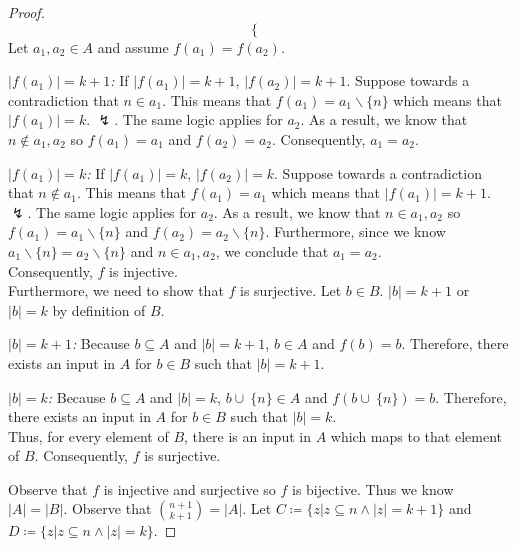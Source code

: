 \documentclass{article}
\newcommand{\union}{\cup\:}
\newcommand{\defeq}{\coloneqq}
\newenvironment{case}[1][Case]
    {\par\textit{#1:}\hfill\break}
    {}
\begin{document}
\begin{enumerate}
\begin{enumerate}
\begin{proof}
\[\begin{cases}
            \end{cases}
            \]
            Let $a_1,a_2 \in A$ and assume $f(a_1)=f(a_2)$.
            \begin{case}[$|f(a_1)|=k+1$]
                If $|f(a_1)|=k+1$, $|f(a_2)|=k+1$. Suppose towards a contradiction that $n \in a_1$. This means that $f(a_1)=a_1 \backslash \{n\}$ which means that $|f(a_1)|=k$. $\lightning$. The same logic applies for $a_2$. As a result, we know that $n \notin a_1,a_2$ so $f(a_1)=a_1$ and $f(a_2)=a_2$. Consequently, $a_1=a_2$.
            \end{case}
            \begin{case}[$|f(a_1)|=k$]
                If $|f(a_1)|=k$, $|f(a_2)|=k$. Suppose towards a contradiction that $n \notin a_1$. This means that $f(a_1)=a_1$ which means that $|f(a_1)|=k+1$. $\lightning$. The same logic applies for $a_2$. As a result, we know that $n \in a_1,a_2$ so $f(a_1)=a_1 \backslash \{n\}$ and $f(a_2)=a_2 \backslash \{n\}$. Furthermore, since we know $a_1 \backslash \{n\}=a_2 \backslash \{n\}$ and $n \in a_1,a_2$, we conclude that $a_1=a_2$.\\
            \end{case}
            Consequently, $f$ is injective.\\
            Furthermore, we need to show that $f$ is surjective. Let $b \in B$. $|b|=k+1$ or $|b|=k$ by definition of $B$.
            \begin{case}[$|b|=k+1$]
                Because $b \subseteq A$ and $|b|=k+1$, $b \in A$ and $f(b)=b$. Therefore, there exists an input in $A$ for $b \in B$ such that $|b|=k+1$.
            \end{case}
            \begin{case}[$|b|=k$]
                Because $b \subseteq A$ and $|b|=k$, $b \union \{n\} \in A$ and $f(b \union \{n\})=b$. Therefore, there exists an input in $A$ for $b \in B$ such that $|b|=k$.\\
            \end{case}
            Thus, for every element of $B$, there is an input in $A$ which maps to that element of $B$. Consequently, $f$ is surjective.
    
            Observe that $f$ is injective and surjective so $f$ is bijective. Thus we know $|A|=|B|$. 
            Observe that $\binom{n+1}{k+1}=|A|$. Let $C \defeq \{z|z \subseteq n \land |z|=k+1\}$ and $D \defeq \{z|z \subseteq n \land |z| = k\}$.
           

\end{proof}
\end{enumerate}
\end{enumerate}
\end{document}
